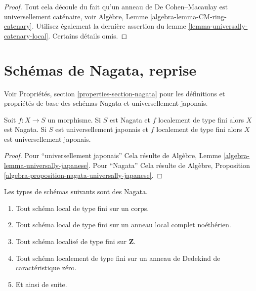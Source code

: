 \begin{proof}
Tout cela découle du fait qu'un anneau
de De Cohen--Macaulay est universellement
caténaire, voir Algèbre, Lemme \ref{algebra-lemma-CM-ring-catenary}.
Utilisez également la dernière
assertion du lemme \ref{lemma-universally-catenary-local}. Certains
détails omis.
\end{proof}























\section{Schémas de Nagata, reprise}
\label{section-nagata}

\noindent
Voir Propriétés, section \ref{properties-section-nagata} pour les définitions et propriétés
de base des schémas Nagata et universellement japonais.

\begin{lemma}
\label{lemma-finite-type-nagata}
Soit $f : X \to S$ un morphisme. Si $S$
est Nagata et $f$ localement de type fini alors $X$ est Nagata. Si $S$
est universellement japonais et
$f$ localement de type fini alors $X$ est universellement japonais.
\end{lemma}

\begin{proof}
Pour ``universellement japonais''
Cela résulte de Algèbre, Lemme \ref{algebra-lemma-universally-japanese}.
Pour ``Nagata''
Cela résulte de Algèbre, Proposition \ref{algebra-proposition-nagata-universally-japanese}.
\end{proof}

\begin{lemma}
\label{lemma-ubiquity-nagata}
Les types de schémas suivants sont des Nagata.
\begin{enumerate}
\item Tout schéma local de type fini sur un corps.
\item Tout schéma local de type fini sur un anneau local complet noéthérien.
\item Tout schéma localisé de type fini sur $\mathbf{Z}$.
\item Tout schéma localement de type fini sur un anneau de Dedekind de
caractéristique zéro.
\item Et ainsi de suite.
\end{enumerate}
\end{lemma}

